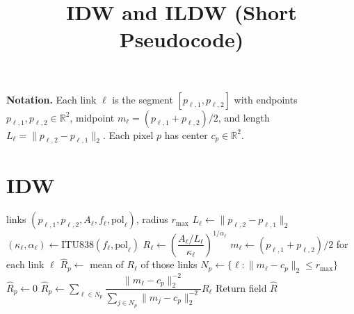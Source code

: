 \documentclass[11pt]{article}
\title{IDW and ILDW (Short Pseudocode)}
\date{}
\newcommand{\RR}{\mathbb{R}}
\begin{document}
\maketitle

\noindent\textbf{Notation.}
Each link $\ell$ is the segment $[p_{\ell,1},p_{\ell,2}]$ with endpoints
$p_{\ell,1},p_{\ell,2}\in\RR^2$, midpoint
$m_\ell = (p_{\ell,1}+p_{\ell,2})/2$, and length
$L_\ell = \|p_{\ell,2}-p_{\ell,1}\|_2$.
Each pixel $p$ has center $c_p\in\RR^2$.

\section*{IDW}
\begin{algorithm}[h]
\caption{Discretized Midpoint IDW}
\begin{algorithmic}[1]
\Require links $(p_{\ell,1},p_{\ell,2},A_\ell,f_\ell,\mathrm{pol}_\ell)$, radius $r_{\max}$
\State $L_\ell \gets \|p_{\ell,2}-p_{\ell,1}\|_2$ 
\State $(\kappa_\ell,\alpha_\ell) \gets \mathrm{ITU838}(f_\ell,\mathrm{pol}_\ell)$
\State $R_\ell \gets \left(\dfrac{A_\ell/L_\ell}{\kappa_\ell}\right)^{1/\alpha_\ell}$ 
\EndFor
{}
\State $m_\ell \gets (p_{\ell,1}+p_{\ell,2})/2$ for each link $\ell$ 
\State $\hat R_p \gets$ mean of $R_\ell$ of those links 
\Else
\State $N_p \gets \{\ell:\|m_\ell-c_p\|_2\le r_{\max}\}$ 
\State $\hat R_p \gets 0$
\Else
\State $\hat R_p \gets \sum_{\ell\in N_p}\dfrac{\|m_\ell-c_p\|_2^{-2}}{\sum_{j\in N_p}\|m_j-c_p\|_2^{-2}} R_\ell$ 
\EndIf
\EndIf
\EndFor
\State Return field $\hat R$
\end{algorithmic}
\end{algorithm}

\clearpage
\end{document}
